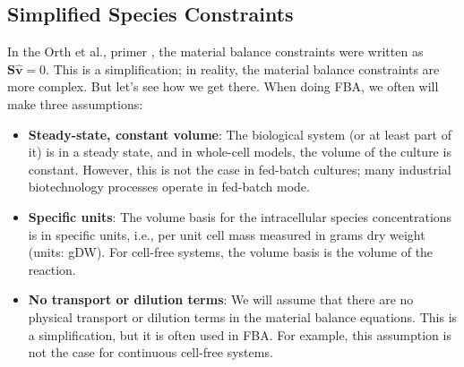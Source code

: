 \documentclass{article}[11pt]
\begin{document}
\subsection{Simplified Species Constraints}
In the Orth et al., primer \cite{Orth:2010aa}, the material balance constraints were written as $\mathbf{S}\hat{\mathbf{v}} = 0$. 
This is a simplification; in reality, the material balance constraints are more complex. But let's see how we get there.
When doing FBA, we often will make three assumptions:
\begin{itemize}[leftmargin=16pt]
\item{\textbf{Steady-state, constant volume}: The biological system (or at least part of it) is in a steady state, and in whole-cell models, the volume of the culture is constant. However, this is not the case in fed-batch cultures; many industrial biotechnology processes operate in fed-batch mode.}
\item{\textbf{Specific units}: The volume basis for the intracellular species concentrations is in specific units, i.e., per unit cell mass measured in grams dry weight (units: gDW). For cell-free systems, the volume basis is the volume of the reaction.}
\item{\textbf{No transport or dilution terms}: We will assume that there are no physical transport or dilution terms in the material balance equations. This is a simplification, but it is often used in FBA. For example, this assumption is not the case for continuous cell-free systems.}
\end{itemize}
\end{document}

